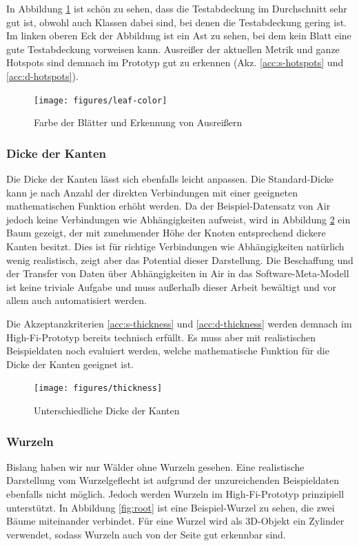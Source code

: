 In Abbildung \ref{fig:leaf-color} ist schön zu sehen, dass die Testabdeckung im Durchschnitt sehr gut ist, obwohl auch Klassen dabei sind, bei denen die Testabdeckung gering ist. Im linken oberen Eck der Abbildung ist ein Ast zu sehen, bei dem kein Blatt eine gute Testabdeckung vorweisen kann. Ausreißer der aktuellen Metrik und ganze Hotspots sind demnach im Prototyp gut zu erkennen (Akz. \ref{acc:s-hotspots} und \ref{acc:d-hotspots}).

\begin{figure}[htb]
  \texttt{[image: figures/leaf-color]}
  \caption{Farbe der Blätter und Erkennung von Ausreißern}
  \label{fig:leaf-color}
\end{figure}

\subsubsection*{Dicke der Kanten}

Die Dicke der Kanten lässt sich ebenfalls leicht anpassen. Die Standard-Dicke kann je nach Anzahl der direkten Verbindungen mit einer geeigneten mathematischen Funktion erhöht werden. Da der Beispiel-Datensatz von Air jedoch keine Verbindungen wie Abhängigkeiten aufweist, wird in Abbildung \ref{fig:thickness} ein Baum gezeigt, der mit zunehmender Höhe der Knoten entsprechend dickere Kanten besitzt. Dies ist für richtige Verbindungen wie Abhängigkeiten natürlich wenig realistisch, zeigt aber das Potential dieser Darstellung. Die Beschaffung und der Transfer von Daten über Abhängigkeiten in Air in das Software-Meta-Modell ist keine triviale Aufgabe und muss außerhalb dieser Arbeit bewältigt und vor allem auch automatisiert werden.

Die Akzeptanzkriterien \ref{acc:s-thickness} und \ref{acc:d-thickness} werden demnach im High-Fi-Prototyp bereits technisch erfüllt. Es muss aber mit realistischen Beispieldaten noch evaluiert werden, welche mathematische Funktion für die Dicke der Kanten geeignet ist.

\begin{figure}[htb]
  \texttt{[image: figures/thickness]}
  \caption{Unterschiedliche Dicke der Kanten}
  \label{fig:thickness}
\end{figure}

\subsubsection*{Wurzeln}

Bislang haben wir nur Wälder ohne Wurzeln gesehen. Eine realistische Darstellung vom Wurzelgeflecht ist aufgrund der unzureichenden Beispieldaten ebenfalls nicht möglich. Jedoch werden Wurzeln im High-Fi-Prototyp prinzipiell  unterstützt. In Abbildung \ref{fig:root} ist eine Beispiel-Wurzel zu sehen, die zwei Bäume miteinander verbindet. Für eine Wurzel wird als 3D-Objekt ein Zylinder verwendet, sodass Wurzeln auch von der Seite gut erkennbar sind.


